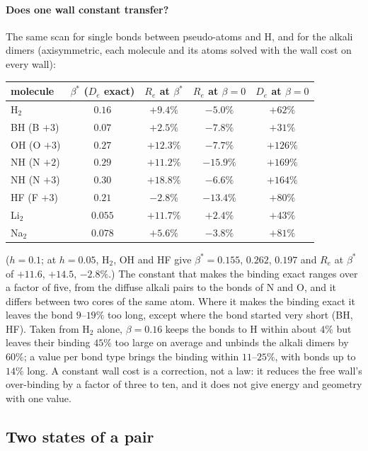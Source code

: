 \documentclass[11pt]{article}
\begin{document}
\paragraph{Does one wall constant transfer?} The same scan for single bonds between pseudo-atoms and H, and for the alkali
dimers (axisymmetric, each molecule and its atoms solved with the wall cost on every wall):
\begin{center}
\small
\begin{tabular}{lcccc}
\toprule
molecule & $\beta^*$ ($D_e$ exact) & $R_e$ at $\beta^*$ & $R_e$ at $\beta = 0$ & $D_e$ at $\beta = 0$ \\
\midrule
H$_2$ & $0.16$ & $+9.4\%$ & $-5.0\%$ & $+62\%$ \\
BH (B $+3$) & $0.07$ & $+2.5\%$ & $-7.8\%$ & $+31\%$ \\
OH (O $+3$) & $0.27$ & $+12.3\%$ & $-7.7\%$ & $+126\%$ \\
NH (N $+2$) & $0.29$ & $+11.2\%$ & $-15.9\%$ & $+169\%$ \\
NH (N $+3$) & $0.30$ & $+18.8\%$ & $-6.6\%$ & $+164\%$ \\
HF (F $+3$) & $0.21$ & $-2.8\%$ & $-13.4\%$ & $+80\%$ \\
Li$_2$ & $0.055$ & $+11.7\%$ & $+2.4\%$ & $+43\%$ \\
Na$_2$ & $0.078$ & $+5.6\%$ & $-3.8\%$ & $+81\%$ \\
\bottomrule
\end{tabular}
\end{center}
($h = 0.1$; at $h = 0.05$, H$_2$, OH and HF give $\beta^* = 0.155$, $0.262$, $0.197$ and $R_e$ at $\beta^*$ of $+11.6$,
$+14.5$, $-2.8\%$.) The constant that makes the binding exact ranges over a factor of five, from the diffuse alkali
pairs to the bonds of N and O, and it differs between two cores of the same atom. Where it makes the binding exact it
leaves the bond $9$--$19\%$ too long, except where the bond started very short (BH, HF). Taken from H$_2$ alone,
$\beta = 0.16$ keeps the bonds to H within about $4\%$ but leaves their binding $45\%$ too large on average and
unbinds the alkali dimers by $60\%$; a value per bond type brings the binding within $11$--$25\%$, with bonds up
to $14\%$ long. A constant wall cost is a correction, not a law: it reduces the free wall's over-binding by a
factor of three to ten, and it does not give energy and geometry with one value.

\subsection{Two states of a pair}
\label{sec:states}
\end{document}
